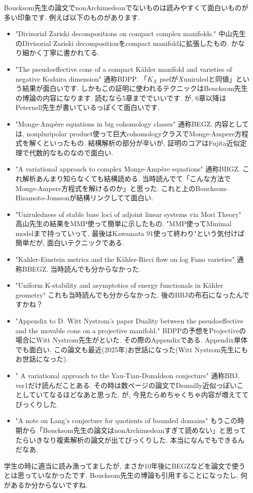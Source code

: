 Boucksom先生の論文でnonArchimedeanでないものは読みやすくて面白いものが多い印象です. 
例えば以下のものがあります.
\vspace{-8pt}
\begin{itemize}[left=0pt]
  \setlength{\parskip}{0cm} %
  \setlength{\itemsep}{0cm} %
  \item "Divisorial Zariski decompositions on compact complex manifolds." 中山先生のDivisorial Zariski decompositionをcompact manifoldに拡張したもの. かなり細かく丁寧に書かれてる. 
  \item "The pseudoeffective cone of a compact Kähler manifold and varieties of negative Kodaira dimension" 通称BDPP. 「$K_X$ psefが$X$uniruledと同値」という結果が面白いです. しかもこの証明に使われるテクニックはBoucksom先生の博論の内容になります. 読むなら5章まででいいです. が, 6章以降はPeternell先生が書いているっぽくて面白いです.
  \item "Monge-Ampère equations in big cohomology classes" 通称BEGZ. 内容としては, nonpluripolar product使って巨大cohomologyクラスでMonge-Ampere方程式を解くといったもの. 結構解析の部分が辛いが, 証明のコアはFujita近似定理で代数的なものなので面白い. 
  \item  "A variational approach to complex Monge-Ampère equations" 通称BBGZ. これ解析あんまり知らなくても結構読める. 当時読んでて「こんな方法でMonge-Ampere方程式を解けるのか」と思った. これと上のBoucksom-Hisamoto-Jonssonが結構リンクしてて面白い. 
  \item "Uniruledness of stable base loci of adjoint linear systems via Mori Theory" 高山先生の結果をMMP使って簡単に示したもの. "MMP使ってMinimal modelまで持っていって, 最後はKawamata 91使って終わり"という気付けば簡単だが, 面白いテクニックである.
  \item "Kahler-Einstein metrics and the Kähler-Ricci flow on log Fano varieties" 通称BBEGZ. 当時読んでも分からなかった. 
  \item "Uniform K-stability and asymptotics of energy functionals in Kähler geometry" これも当時読んでも分からなかった. 後のBBJの布石になったんですかね？
  \item "Appendix to D. Witt Nystrom's paper Duality between the pseudoeffective and the movable cone on a projective manifold." BDPPの予想をProjectiveの場合にWitt Nystrom先生がといた. その際のAppendixである. Appendix単体でも面白い. この論文も最近(2025年)お世話になった(Witt Nystrom先生にもお世話になった).
  \item " A variational approach to the Yau-Tian-Donaldson conjecture" 通称BBJ. ver1だけ読んだことある. その時は数ページの論文でDemailly近似っぽいことしていてなるほどなあと思った. が, 今見たらめちゃくちゃ内容が増えててびっくりした. 
  \item "A note on Lang's conjecture for quotients of bounded domains" もうこの時期から「Boucksom先生の論文はnonArchimedeanすぎて読めない」と思ってたらいきなり複素解析の論文が出てびっくりした. 本当になんでもできるんだなあ.
    \end{itemize}
学生の時に適当に読み漁ってましたが, まさか10年後にBEGZなどを論文で使うとは思っていなかったです.
Boucksom先生の博論も引用することになったし, 何があるか分からないですね. 
  \vspace{8pt}



